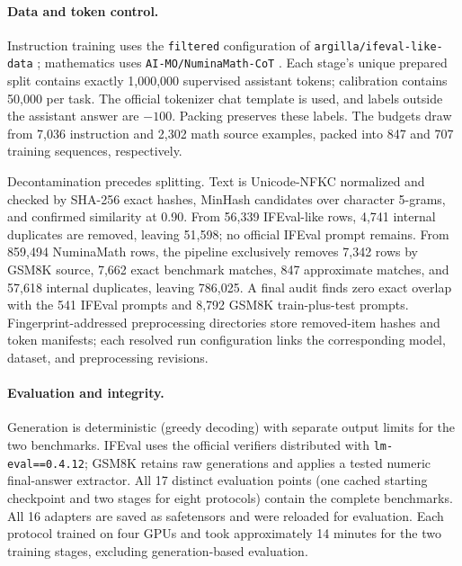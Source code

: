 \documentclass{article}
\begin{document}
\paragraph{Data and token control.}
Instruction training uses the \texttt{filtered} configuration of
\texttt{argilla/ifeval-like-data} \citep{argillaifevallike}; mathematics uses
\texttt{AI-MO/NuminaMath-CoT} \citep{li2024numinamath}. Each stage's unique
prepared split contains exactly 1,000,000 supervised assistant tokens;
calibration contains 50,000 per task. The official tokenizer chat template is
used, and labels outside the assistant answer are $-100$. Packing preserves
these labels. The budgets draw from 7,036 instruction and 2,302 math source
examples, packed into 847 and 707 training sequences, respectively.

Decontamination precedes splitting. Text is Unicode-NFKC normalized and
checked by SHA-256 exact hashes, MinHash candidates over character 5-grams,
and confirmed similarity at 0.90. From 56,339 IFEval-like rows, 4,741 internal
duplicates are removed, leaving 51,598; no official IFEval prompt remains.
From 859,494 NuminaMath rows, the pipeline exclusively removes 7,342 rows by
GSM8K source, 7,662 exact benchmark matches, 847 approximate matches, and
57,618 internal duplicates, leaving 786,025. A final audit finds zero exact
overlap with the 541 IFEval prompts and 8,792 GSM8K train-plus-test prompts.
Fingerprint-addressed preprocessing directories store removed-item hashes and
token manifests; each resolved run configuration links the corresponding
model, dataset, and preprocessing revisions.

\paragraph{Evaluation and integrity.}
Generation is deterministic (greedy decoding) with separate output limits for
the two benchmarks. IFEval uses the official verifiers distributed with
\texttt{lm-eval==0.4.12}; GSM8K retains raw generations and applies a tested
numeric final-answer extractor. All 17 distinct evaluation points (one cached
starting checkpoint and two stages for eight protocols) contain the complete
benchmarks. All 16 adapters are saved as safetensors and were reloaded for
evaluation. Each protocol trained on four GPUs and took approximately 14
minutes for the two training stages, excluding generation-based evaluation.

\begin{table}[h]
  \centering
  \caption{Manual rank patterns. Early, middle, and late each contain 12
  blocks. Exact parameter equality follows from identical projection shapes.}
  \label{tab:ranks}
  \resizebox{\columnwidth}{!}{}
\end{table}
\end{document}
